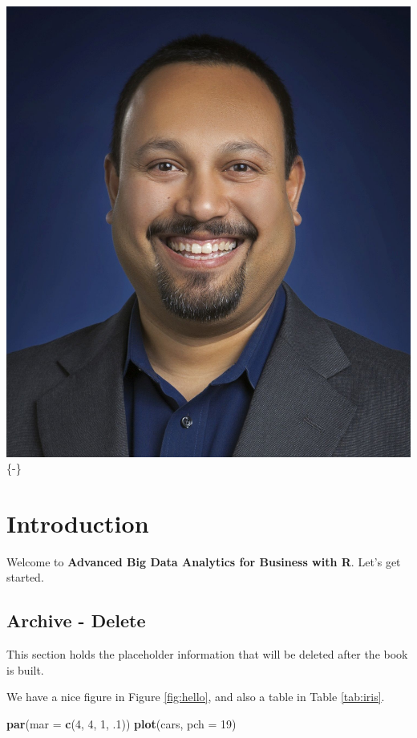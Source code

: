\documentclass[]{krantz}
\makeatletter
\newenvironment{Shaded}{\begin{snugshade}}{\end{snugshade}}
\newcommand{\KeywordTok}[1]{\textcolor[rgb]{0.27,0.27,0.27}{\textbf{#1}}}
\newcommand{\DataTypeTok}[1]{\textcolor[rgb]{0.27,0.27,0.27}{#1}}
\newcommand{\DecValTok}[1]{\textcolor[rgb]{0.06,0.06,0.06}{#1}}
\newcommand{\NormalTok}[1]{#1}
\newenvironment{kframe}{%
\medskip{}
\setlength{\fboxsep}{.8em}
 \def\at@end@of@kframe{}%
 \ifinner\ifhmode%
  \def\at@end@of@kframe{\end{minipage}}%
  \begin{minipage}{\columnwidth}%
 \fi\fi%
 \def\FrameCommand##1{\hskip\@totalleftmargin \hskip-\fboxsep
 \colorbox{shadecolor}{##1}\hskip-\fboxsep
     \hskip-\linewidth \hskip-\@totalleftmargin \hskip\columnwidth}%
 \MakeFramed {\advance\hsize-\width
   \@totalleftmargin\z@ \linewidth\hsize
   \@setminipage}}%
 {\par\unskip\endMakeFramed%
 \at@end@of@kframe}
\renewenvironment{Shaded}{\begin{kframe}}{\end{kframe}}
\theoremstyle{definition}
\theoremstyle{definition}
\theoremstyle{definition}
\theoremstyle{remark}
\makeatother
\begin{document}
\includegraphics{images/SanjeevKumar.jpg} \{-\}

\mainmatter

\chapter{Introduction}\label{introduction}

Welcome to \textbf{Advanced Big Data Analytics for Business with R}.
Let's get started.

\section{Archive - Delete}\label{archive---delete}

This section holds the placeholder information that will be deleted
after the book is built.

We have a nice figure in Figure \ref{fig:hello}, and also a table in
Table \ref{tab:iris}.

\begin{Shaded}
\begin{Highlighting}[]
\KeywordTok{par}\NormalTok{(}\DataTypeTok{mar =} \KeywordTok{c}\NormalTok{(}\DecValTok{4}\NormalTok{, }\DecValTok{4}\NormalTok{, }\DecValTok{1}\NormalTok{, .}\DecValTok{1}\NormalTok{))}
\KeywordTok{plot}\NormalTok{(cars, }\DataTypeTok{pch =} \DecValTok{19}\NormalTok{)}
\end{Highlighting}
\end{Shaded}
\end{document}

